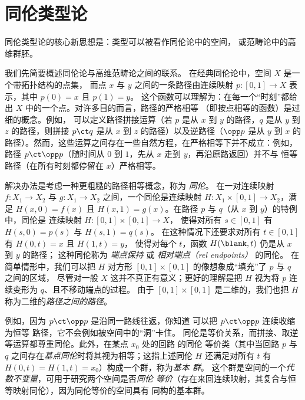 \chapter{同伦类型论}
\label{cha:basics}

同伦类型论的核心新思想是：类型可以被看作同伦论中的空间，
或范畴论中的高维群胚。

我们先简要概述同伦论与高维范畴论之间的联系。
在经典同伦论中，空间 $X$ 是一个带拓扑结构的点集，
而点 $x$ 与 $y$ 之间的一条路径由连续映射
$p : [0,1] \to X$ 表示，其中 $p(0) = x$ 且 $p(1) = y$。
这个函数可以理解为：在每一个“时刻”都给出 $X$ 中的一个点。对许多目的而言，路径的严格相等
（即按点相等的函数）是过细的概念。例如，
可以定义路径拼接运算（若 $p$ 是从
$x$ 到 $y$ 的路径，$q$ 是从 $y$ 到 $z$ 的路径，则拼接 $p
\ct q$ 是从 $x$ 到 $z$ 的路径）以及逆路径（$\opp p$ 是从
$y$ 到 $x$ 的路径）。然而，这些运算之间存在一些自然方程，在严格相等下并不成立：例如，路径
$p \ct \opp p$（随时间从 $0$ 到 $1$，先从 $x$ 走到 $y$，再沿原路返回）并不与
恒等路径（在所有时刻都停留在 $x$）严格相等。

解决办法是考虑一种更粗糙的路径相等概念，称为
\emph{同伦}。
在一对连续映射 $f :
X_1 \to X_2$ 与 $g : X_1\to X_2$ 之间，一个同伦是连续映射 $H : X_1
\times [0, 1] \to X_2$，满足 $H(x, 0) = f (x)$ 且 $H(x, 1) =
g(x)$。在路径 $p$ 与 $q$（从 $x$ 到 $y$）的特例中，同伦是
连续映射 $H : [0,1] \times [0,1] \rightarrow X$，
使得对所有 $s\in [0,1]$ 有 $H(s,0) = p(s)$ 与 $H(s,1) = q(s)$。
在这种情况下还要求对所有 $t\in [0,1]$ 有 $H(0,t) = x$ 且 $H(1,t)=y$，
使得对每个 $t$，函数 $H(\blank,t)$ 仍是从 $x$ 到 $y$ 的路径；
这种同伦称为 \emph{端点保持} 或 \emph{相对端点（rel endpoints）} 的同伦。
在简单情形中，我们可以把 $H$ 对方形 $[0,1]\times [0,1]$ 的像想象成“填充”了 $p$ 与 $q$ 之间的区域，
尽管对一般 $X$ 这并不真正有意义；更好的理解是把 $H$ 视为将 $p$ 连续变形为 $q$、且不移动端点的过程。
由于 $[0,1]\times [0,1]$ 是二维的，我们也把 $H$ 称为二维的\emph{路径之间的路径}。

例如，因为
$p \ct \opp p$ 是沿同一路线往返，你知道
可以把 $p \ct \opp p$ 连续收缩为恒等
路径，它不会例如被空间中的“洞”卡住。
同伦是等价关系，而拼接、取逆等运算都尊重同伦。此外，在某点 $x_0$ 处的回路 的同伦
等价类（其中当回路 $p$
与 $q$ 之间存在\emph{基点同伦}时将其视为相等；这指上述同伦 $H$ 还满足对所有 $t$ 有 $H(0,t) =
H(1,t) = x_0$）构成一个群，称为\emph{基本
群}。 这个群是空间的一个\emph{代数不变量}，可用于研究两个空间是否\emph{同伦
等价}（存在来回连续映射，其复合与恒等映射同伦），因为同伦等价的空间具有
同构的基本群。


